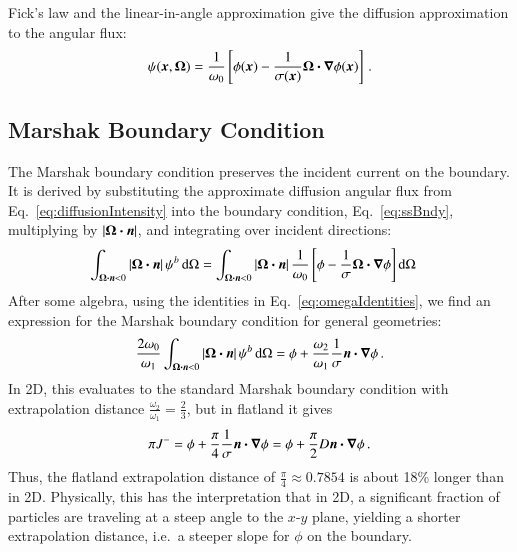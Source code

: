 \documentclass{anstrans}
\begin{document}
Fick's law and the linear-in-angle approximation give the diffusion
approximation to the angular flux:
\begin{equation} \label{eq:diffusionIntensity}
  \psi(\bm{x}, \bm{\Omega})
  = \frac{1}{\omega_0} \left[ \phi(\bm{x})
  - \frac{1}{\sigma(\bm{x})}
  \bm{\Omega} \bm{\cdot} \bm{\nabla} \phi(\bm{x}) \right] \,.
\end{equation}

\subsection{Marshak Boundary Condition}
The Marshak boundary condition preserves the incident
current on the boundary. It is derived by substituting the approximate diffusion
angular flux from Eq.~\eqref{eq:diffusionIntensity} into the boundary condition,
Eq.~\eqref{eq:ssBndy}, multiplying by $\left| \bm{\Omega}\bm{\cdot} \bm{n} \right|$, and integrating over
incident directions:
\begin{align*}
\int_{\bm{\Omega}\bm{\cdot} \bm{n} < 0 } \left| \bm{\Omega}\bm{\cdot} \bm{n} \right|
\psi^b \mathop{}\!\mathrm{d}\Omega
 &= 
\int_{\bm{\Omega}\bm{\cdot} \bm{n} < 0 } \left| \bm{\Omega}\bm{\cdot} \bm{n} \right| 
 \frac{1}{\omega_0} \left[ \phi - \frac{1}{\sigma}
  \bm{\Omega} \bm{\cdot} \bm{\nabla} \phi \right]
  \mathop{}\!\mathrm{d}\Omega
\end{align*}
After some algebra, using the identities in Eq.~\eqref{eq:omegaIdentities}, we
find an expression for the Marshak boundary condition for general geometries:
\begin{equation} \label{eq:marshak}
\frac{2\omega_0}{\omega_1}
\int_{\bm{\Omega}\bm{\cdot} \bm{n} < 0 } \left| \bm{\Omega}\bm{\cdot} \bm{n} \right|
\psi^b \mathop{}\!\mathrm{d}\Omega
=
\phi + \frac{\omega_2}{\omega_1}\frac{1}{\sigma} \bm{n} \bm{\cdot} \bm{\nabla} \phi \,.
\end{equation}
In 2D, this evaluates to the standard Marshak boundary condition with
extrapolation distance $\frac{\omega_2}{\omega_1} = \frac23$, but in flatland
it gives
\begin{equation*}
\pi J^{-} = \phi + \frac{\pi}{4}\frac{1}{\sigma} \bm{n} \bm{\cdot} \bm{\nabla} \phi
= \phi + \frac{\pi}{2} D \bm{n} \bm{\cdot} \bm{\nabla} \phi\,.
\end{equation*}
Thus, the flatland extrapolation distance of $\frac{\pi}{4} \approx 0.7854$
is about 18\% longer than in 2D.
Physically, this has the interpretation that in 2D, a significant fraction of
particles are traveling at a steep angle to the $x$-$y$ plane, yielding a
shorter extrapolation distance, i.e.~a steeper slope for $\phi$ on the boundary.
\end{document}
